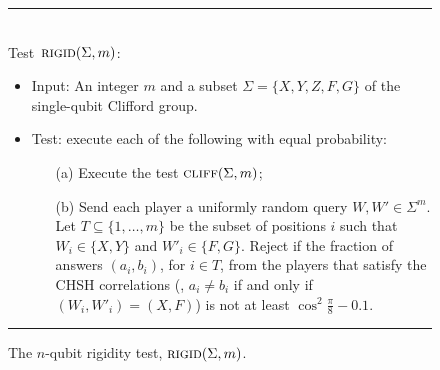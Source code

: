\documentclass{toc}
\newcommand{\rigid}{\textsc{rigid}}
\newcommand{\cliff}{\textsc{cliff}}
\begin{document}
\begin{figure}[H]
\rule[1ex]{\textwidth}{0.5pt}\\
Test~$\rigid(\Sigma,m)$:
\begin{itemize}
    \item Input: An integer $m$ and a subset $\Sigma = \{X,Y,Z,F,G\}$ of the single-qubit Clifford group. 
    \item Test: execute each of the following with equal probability:
\begin{enumerate}
\item[(a)] Execute the test $\cliff(\Sigma,m)$;
\item[(b)] Send each player a uniformly random query $W,W'\in \Sigma^m$. Let $T \subseteq \{1,\ldots,m\}$ be the subset of positions $i$ such that $W_i \in \{X,Y\}$ and $W'_i\in\{F,G\}$. Reject if the fraction of answers $(a_i,b_i)$, for $i\in T$, from the players that satisfy the CHSH correlations (\ie, $a_i\neq b_i$ if and only if $(W_i,W'_i)=(X,F)$) is not at least $\cos^2 \frac{\pi}{8} - 0.1$.
\end{enumerate}
\end{itemize}
\rule[2ex]{\textwidth}{0.5pt}\vspace{-.5cm}
\caption{The $n$-qubit rigidity test, $\rigid(\Sigma,m)$.}
\label{fig:rigid}
\end{figure}
\end{document}
